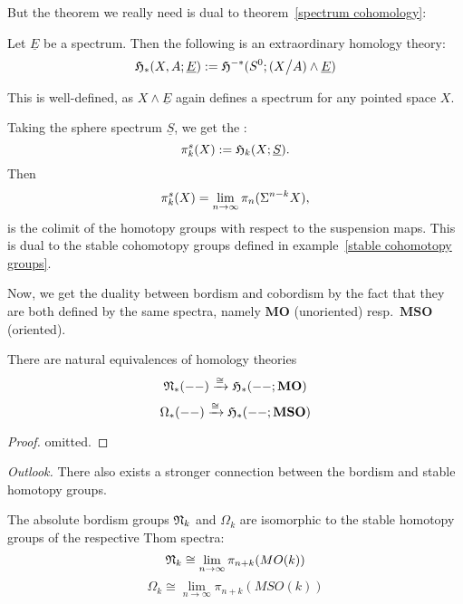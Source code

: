 \documentclass[a4paper,12pt]{article}
\begin{document}
But the theorem we really need is dual to theorem\ \ref{spectrum cohomology}:
\begin{theodef}
    Let \(\underline{E}\) be a spectrum. Then the following is an extraordinary homology theory:
    \[\mathfrak{H}_\ast(X,A;\underline{E}):=\mathfrak{H}^{-\ast}(S^0;(X\big/A)\land \underline{E})\]
\end{theodef}

\begin{remark}
    This is well-defined, as \(X\land\underline{E}\) again defines a spectrum for any pointed space \(X\).
\end{remark}

\begin{example}
    Taking the sphere spectrum \(\underline{S}\), we get the :
    \[\pi^s_k(X):=\mathfrak{H}_k(X;\underline{S}).\]
    Then
    \[\pi^s_k(X)=\lim_{n\to\infty}\pi_n(\Sigma^{n-k}X),\]
    is the colimit of the homotopy groups with respect to the suspension maps.\linebreak
    This is dual to the stable cohomotopy groups defined in example\ \ref{stable cohomotopy groups}.
\end{example}

Now, we get the duality between bordism and cobordism by the fact that they are both defined by the same spectra, namely \(\mathbf{MO}\) (unoriented) resp.\ \(\mathbf{MSO}\) (oriented).

\begin{theorem}
    There are natural equivalences of homology theories
    \[\mathfrak{N}_\ast(--)\xrightarrow{\cong}\mathfrak{H}_\ast(--;\mathbf{MO})\]
    \[\Omega_\ast(--)\xrightarrow{\cong}\mathfrak{H}_\ast(--;\mathbf{MSO})\]
\end{theorem}

\begin{proof}
    omitted.
\end{proof}

\noindent\textit{Outlook.} There also exists a stronger connection between the bordism and stable homotopy groups.
\begin{theorem}
    The absolute bordism groups \(\mathfrak{N}_k\) and \(\Omega_k\) are isomorphic to the stable homotopy groups of the respective Thom spectra:
    \[\mathfrak{N}_k\cong\lim_{n\to\infty}\pi_{n+k}(MO(k))\]
    \[\Omega_k\cong\lim_{n\to\infty}\pi_{n+k}(MSO(k))\]
\end{theorem}






\newpage
{}
\printbibliography%
\end{document}
